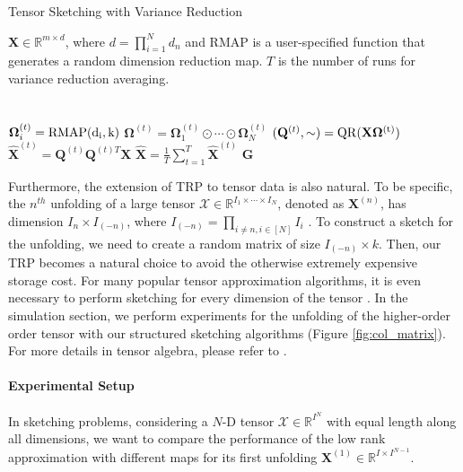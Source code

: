 \begin{algorithm}[H]
	\caption{Tensor Sketching with Variance Reduction}\label{alg:var-red-structure-sketching}
	\begin{algorithmic}[1]
		\Require $\mathbf{X} \in \mathbb{R}^{m \times d}$, where $d = \prod_{i=1}^N d_n$ and 
		\rm{RMAP} is a user-specified function that generates a random dimension reduction map. $T$ is the number of runs for variance reduction averaging. 
		\\
		\\
		 \\
		$\mathbf{\Omega}_i^{(t)} = \rm{RMAP}(d_i, k)$
		\State $\mathbf{\Omega}^{(t)} = \mathbf{\Omega}_1^{(t)} \odot \cdots \odot \mathbf{\Omega}_{N}^{(t)}$
		\State $(\mathbf{Q}^{(t)}, \sim ) = \rm{QR}(\mathbf{X}\mathbf{\Omega}^{(t)})$ 
		\State $\hat{\mathbf{X}}^{(t)} = \mathbf{Q}^{(t)}\mathbf{Q}^{(t)T}\mathbf{X}$
		\State
		$\hat{\mathbf{X}} = \frac{1}{T}\sum_{t=1}^T \hat{\mathbf{X}}^{(t)}$
		\State \Return $\mathbf{G}$
		\EndFunction
	\end{algorithmic}
\end{algorithm}

Furthermore, the extension of TRP to tensor data is also natural. To be specific, the $n^{th}$ unfolding of a large tensor $\mathscr{X} \in \mathbb{R}^{I_1 \times \cdots \times I_N}$, denoted as $\mathbf{X}^{(n)}$, has dimension $I_n \times I_{(-n)}$, where $I_{(-n)} = \prod_{i \neq n, i \in [N]} I_i$ . To construct a sketch for the unfolding, we need to create a random matrix of size $ I_{(-n)} \times k$. Then, our TRP becomes a natural choice to avoid the otherwise extremely expensive storage cost. For many popular tensor approximation algorithms, it is even necessary to perform sketching for every dimension of the tensor \citep{de2000multilinear,wang2015fast}. 
In the simulation section, we perform experiments for the unfolding of the higher-order order tensor with our structured sketching algorithms (Figure \ref{fig:col_matrix}). For more details in tensor algebra, please refer to \citep{kolda2009tensor}. 


\paragraph{Experimental Setup}
In sketching problems, considering a $N$-D tensor $\mathscr{X} \in \mathbb{R}^{I^N}$ with equal length along all dimensions, we want to compare the performance of the low rank approximation with different maps for its first unfolding $\mathbf{X}^{(1)} \in \mathbb{R}^{I \times I^{N-1}}$. 
	
